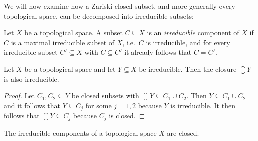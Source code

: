 \begin{theorem}
\[%
  \]
\end{theorem}


\begin{fluff}
  We will now examine how a Zariski closed subset, and more generally every topological space, can be decomposed into irreducible subsets:
\end{fluff}


\begin{definition}
  Let $X$ be a topological space.
  A subset $C \subseteq X$ is an \emph{irreducible} component of $X$ if $C$ is a maximal irreducible subset of $X$, i.e.\ $C$ is irreducible, and for every irreducible subset $C' \subseteq X$ with $C \subseteq C'$ it already follows that $C = C'$.
\end{definition}


\begin{lemma}
  Let $X$ be a topological space and let $Y \subseteq X$ be irreducible.
  Then the closure $\closure{Y}$ is also irreducible.
\end{lemma}


\begin{proof}
  Let $C_1, C_2 \subseteq Y$ be closed subsets with $\closure{Y} \subseteq C_1 \cup C_2$.
  Then $Y \subseteq C_1 \cup C_2$ and it follows that $Y \subseteq C_j$ for some $j = 1,2$ because $Y$ is irreducible.
  It then follows that $\closure{Y} \subseteq C_j$ because $C_j$ is closed.
\end{proof}


\begin{corollary}
  The irreducible components of a topological space $X$ are closed.
\end{corollary}


